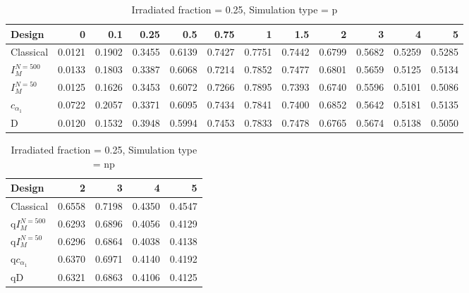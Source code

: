 \documentclass[a4paper]{article}
\begin{document}
\begin{table}[ht]
\centering
\begin{tabular}{lrrrrrrrrrrr}
  \hline
Design & 0 & 0.1 & 0.25 & 0.5 & 0.75 & 1 & 1.5 & 2 & 3 & 4 & 5 \\ 
  \hline
Classical & 0.0121 & 0.1902 & 0.3455 & 0.6139 & 0.7427 & 0.7751 & 0.7442 & 0.6799 & 0.5682 & 0.5259 & 0.5285 \\ 
  $I_M^{N=500}$ & 0.0133 & 0.1803 & 0.3387 & 0.6068 & 0.7214 & 0.7852 & 0.7477 & 0.6801 & 0.5659 & 0.5125 & 0.5134 \\ 
  $I_M^{N=50}$ & 0.0125 & 0.1626 & 0.3453 & 0.6072 & 0.7266 & 0.7895 & 0.7393 & 0.6740 & 0.5596 & 0.5101 & 0.5086 \\ 
  $c_{\alpha_1}$ & 0.0722 & 0.2057 & 0.3371 & 0.6095 & 0.7434 & 0.7841 & 0.7400 & 0.6852 & 0.5642 & 0.5181 & 0.5135 \\ 
  D & 0.0120 & 0.1532 & 0.3948 & 0.5994 & 0.7453 & 0.7833 & 0.7478 & 0.6765 & 0.5674 & 0.5138 & 0.5050 \\ 
   \hline
\end{tabular}
\caption{Irradiated fraction = 0.25, Simulation type = p} 
\end{table}

\begin{table}[ht]
\centering
\begin{tabular}{lrrrr}
  \hline
Design & 2 & 3 & 4 & 5 \\ 
  \hline
Classical & 0.6558 & 0.7198 & 0.4350 & 0.4547 \\ 
  q$I_M^{N=500}$ & 0.6293 & 0.6896 & 0.4056 & 0.4129 \\ 
  q$I_M^{N=50}$ & 0.6296 & 0.6864 & 0.4038 & 0.4138 \\ 
  q$c_{\alpha_1}$ & 0.6370 & 0.6971 & 0.4140 & 0.4192 \\ 
  qD & 0.6321 & 0.6863 & 0.4106 & 0.4125 \\ 
   \hline
\end{tabular}
\caption{Irradiated fraction = 0.25, Simulation type = np} 
\end{table}

\newpage
\end{document}
